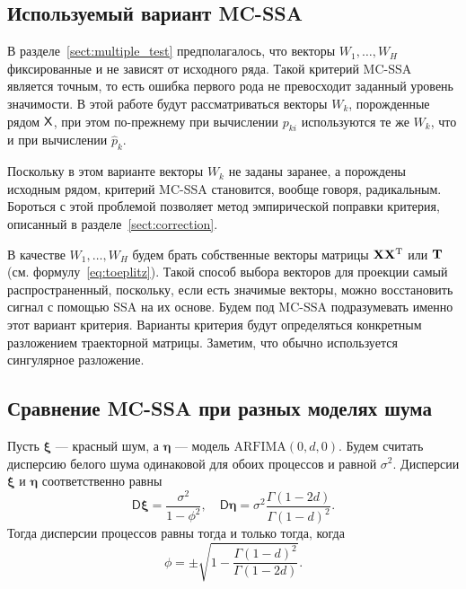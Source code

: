 \documentclass[specialist,
substylefile = spbu_report.rtx,
subf,href,colorlinks=true, 12pt]{disser}
\theoremstyle{definition}
\newtheorem{remark}{Замечание}[section]
\begin{document}

\subsection{Используемый вариант MC-SSA}\label{sect:vectors_choise}
В разделе~\ref{sect:multiple_test} предполагалось, что векторы $W_1,\ldots, W_H$ фиксированные и не зависят от исходного ряда. Такой критерий MC-SSA является точным, то есть ошибка первого рода не превосходит заданный уровень значимости. В этой работе будут рассматриваться векторы $W_k$, порожденные рядом $\mathsf{X}$, при этом по-прежнему при вычислении $p_{ki}$ используются те же $W_k$, что и при вычислении $\widehat p_k$.

Поскольку в этом варианте векторы $W_k$ не заданы заранее, а порождены исходным рядом, критерий MC-SSA становится, вообще говоря, радикальным. Бороться с этой проблемой позволяет метод эмпирической поправки критерия, описанный в разделе~\ref{sect:correction}.

В качестве $W_1, \ldots,W_H$ будем брать собственные векторы матрицы $\mathbf{X}\mathbf{X}^{\mathrm{T}}$ или $\mathbf{T}$ (см. формулу~\eqref{eq:toeplitz}). Такой способ выбора векторов для проекции самый распространенный, поскольку, если есть значимые векторы, можно восстановить сигнал с помощью SSA на их основе. Будем под MC-SSA подразумевать именно этот вариант критерия. Варианты критерия будут определяться конкретным разложением траекторной матрицы. Заметим, что обычно используется сингулярное разложение.


\subsection{Сравнение MC-SSA при разных моделях шума}
Пусть $\bm \xi$ --- красный шум, а $\bm \eta$ --- модель $\mathrm{ARFIMA}(0, d, 0)$. Будем считать дисперсию белого шума одинаковой для обоих процессов и равной $\sigma^2$. Дисперсии $\bm\xi$ и $\bm\eta$ соответственно равны
\[
	\mathsf{D}\bm\xi = \frac{\sigma^2}{1 - \phi^2}, \quad \mathsf{D}\bm\eta = \sigma^2\frac{\Gamma(1 - 2d)}{\Gamma(1-d)^2}.
\]
Тогда дисперсии процессов равны тогда и только тогда, когда
\[
	\phi=\pm\sqrt{1-\frac{\Gamma(1-d)^2}{\Gamma(1-2d)}}.
\]
\end{document}

